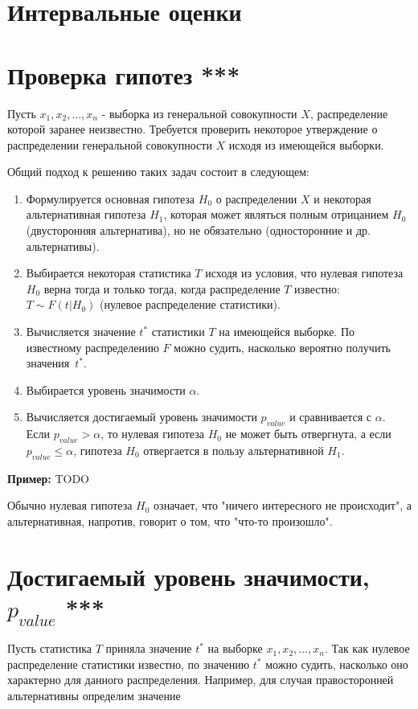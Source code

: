 \section{Интервальные оценки}


\section{Проверка гипотез ***}

Пусть $x_1, x_2, ..., x_n$ - выборка из генеральной совокупности $X$, распределение которой заранее неизвестно.
Требуется проверить некоторое утверждение о распределении генеральной совокупности $X$ исходя из имеющейся выборки.

Общий подход к решению таких задач состоит в следующем:
\begin{enumerate}
    \item Формулируется основная гипотеза $H_0$ о распределении $X$ и некоторая альтернативная гипотеза $H_1$, которая может являться полным отрицанием $H_0$ (двусторонняя альтернатива), но не обязательно (односторонние и др. альтернативы).
    \item Выбирается некоторая статистика $T$ исходя из условия, что нулевая гипотеза $H_0$ верна тогда и только тогда, когда распределение $T$ известно: $T \sim F(t|H_0)$ (нулевое распределение статистики). 
    \item Вычисляется значение $t^*$ статистики $T$ на имеющейся выборке. По известному распределению $F$ можно судить, насколько вероятно получить значения~$t^*$.
    \item Выбирается уровень значимости $\alpha$.
    \item Вычисляется достигаемый уровень значимости $p_{value}$ и сравнивается с $\alpha$. Если $p_{value} > \alpha$, то нулевая гипотеза $H_0$ не может быть отвергнута, а если $p_{value} \leqslant \alpha$, гипотеза $H_0$ отвергается в пользу альтернативной $H_1$.
\end{enumerate}

\textbf{Пример:} TODO

Обычно нулевая гипотеза $H_0$ означает, что "ничего интересного не происходит", а альтернативная, напротив, говорит о том, что "что-то произошло".

\section{Достигаемый уровень значимости, $p_{value}$ ***}

Пусть статистика $T$ приняла значение $t^*$ на выборке $x_1, x_2, ..., x_n$. Так как нулевое распределение статистики известно, по значению $t^*$ можно судить, насколько оно характерно для данного распределения. Например, для случая правосторонней альтернативны определим значение

